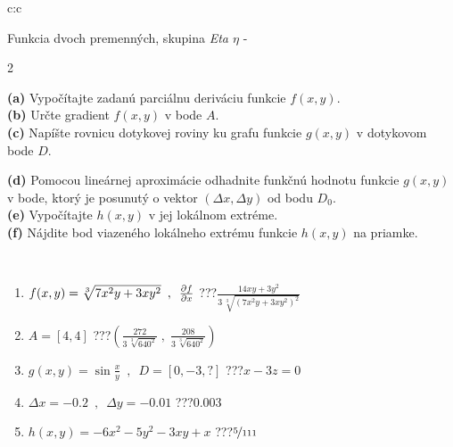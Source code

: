 \documentclass[10pt]{report}
\begin{document}
\begin{tabular}{c:c}
\begin{minipage}[c][104.5mm][t]{0.5\linewidth}
\begin{center}
\vspace{7mm}
{\huge \LARGE Funkcia dvoch premenných, skupina \textit{Eta $\eta$} -}\\[5mm]
\begin{minipage}{0.95\linewidth}
\begin{center}
{\small \begin{multicols}{2} \raggedright
\textbf{(a)} Vypočítajte zadanú parciálnu deriváciu funkcie \(f(x,y)\). \\[1mm]
\textbf{(b)} Určte gradient \(f(x,y)\) v bode \(A\). \\[1mm]
\textbf{(c)} Napíšte rovnicu dotykovej roviny ku grafu funkcie \(g(x,y)\) v dotykovom bode \(D\). \par \columnbreak
\textbf{(d)} Pomocou lineárnej aproximácie odhadnite funkčnú hodnotu funkcie \(g(x,y)\) v bode, ktorý je posunutý o vektor \((\Delta x, \Delta y)\) od bodu \(D_0\). \\[1mm]
\textbf{(e)} Vypočítajte \(h(x,y)\) v jej lokálnom extréme. \\[1mm]
\textbf{(f)} Nájdite bod viazeného lokálneho extrému funkcie \(h(x,y)\) na priamke. \\[1mm]
\end{multicols}
}
\end{center}
\end{minipage}
\\[4mm]
\begin{minipage}{0.79\linewidth}
\begin{center}
\begin{varwidth}{\linewidth}
\begin{enumerate}
\normalsizerr
\item $f(x,y) = \sqrt[3]{7x^2y + 3xy^2}\enspace , \enspace \pdv{f}{x}$\quad \dotfill\; ???\;\dotfill \quad $\frac{14xy+3y^2}{3\,\sqrt[3]{(7x^2y+3xy^2)^{2}}}$
\item $A = [4, 4]$\quad \dotfill\; ???\;\dotfill \quad $\left( \frac{272}{3\,\sqrt[3]{640^2}} \;,\; \frac{208}{3\,\sqrt[3]{640^2}} \right)$
\item $g(x,y) = \sin\frac{x}{y} \enspace , \enspace D = [0, -3, ?]$\quad \dotfill\; ???\;\dotfill \quad $x-3z=0$
\item $\Delta x = {-0.2} \enspace,\enspace \Delta y = {-0.01}$\quad \dotfill\; ???\;\dotfill \quad $0.003$
\item $h(x,y) = -6x^2-5y^2-3xy+x$\quad \dotfill\; ???\;\dotfill \quad $\nicefrac{5}{111}$

\end{enumerate}
\end{varwidth}
\end{center}
\end{minipage}
\end{center}
\end{minipage}
\end{tabular}
\end{document}
